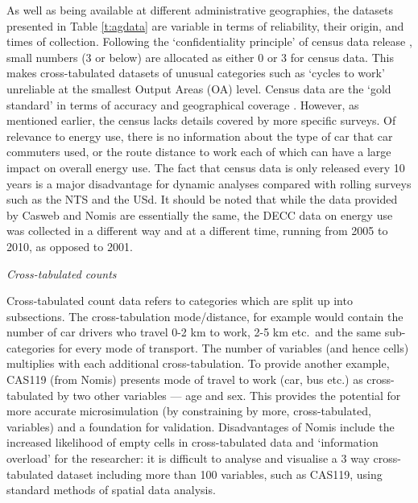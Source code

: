 As well as being available at different administrative geographies, the datasets
presented in Table \ref{t:agdata} are variable in terms of reliability, their
origin, and times of collection.
Following the `confidentiality principle' of
census data release \citep{Rees2002}, small numbers (3 or below) are allocated
as either 0 or 3 for census data.
This makes cross-tabulated datasets of unusual categories such as `cycles to
work' unreliable at the smallest Output Areas (OA) level.
Census data are the `gold standard' in terms of accuracy
and geographical coverage \citep[p.~4]{Martin2002}.
However, as mentioned earlier, the census lacks details covered by more
specific surveys. Of relevance to energy use, there is no information about the
type of car that car commuters used, or the route distance to work each of
which can have a large impact on overall energy use. The fact that census data
is only released every 10 years is a major disadvantage for dynamic analyses
compared with rolling surveys such as the NTS and the USd. It should be noted
that while the data provided by Casweb and Nomis are essentially the same,
the DECC data on energy use was collected in a different way and at a different
time, running from 2005 to 2010, as opposed to 2001.

\emph{Cross-tabulated counts}

Cross-tabulated count data refers to categories which are split up into
subsections. The cross-tabulation mode/distance, for example would contain the
number of car drivers who travel 0-2 km to work, 2-5 km etc.~and the same
sub-categories for every mode of transport. The number of variables (and hence
cells) multiplies with each additional cross-tabulation. To provide another
example, CAS119 (from Nomis) presents mode of travel to work (car, bus etc.) as
cross-tabulated by two other variables --- age and sex.
This provides the potential for more accurate microsimulation (by constraining
by more, cross-tabulated, variables) and a foundation for
validation. Disadvantages of Nomis include the increased likelihood of
empty cells in cross-tabulated data
and `information overload' for the researcher: it is difficult to analyse and
visualise a 3 way cross-tabulated dataset including more than 100 variables,
such as CAS119, using standard methods of spatial data analysis.

